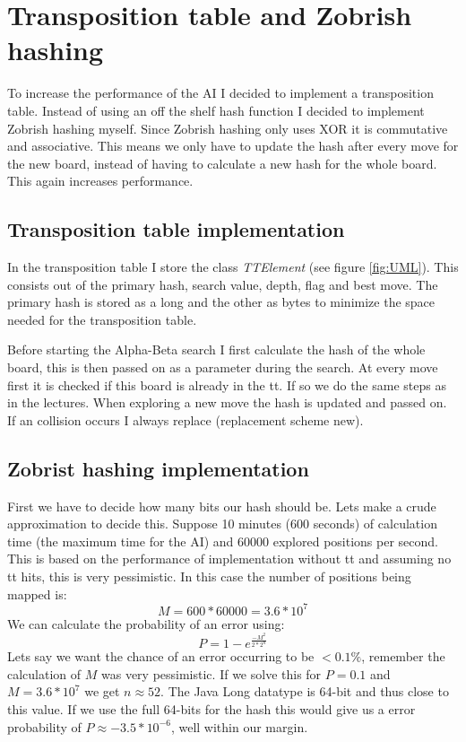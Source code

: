 \documentclass{article}
\begin{document}
\section{Transposition table and Zobrish hashing}
To increase the performance of the AI I decided to implement a transposition table. Instead of using an off the shelf hash function I decided to implement Zobrish hashing myself. Since Zobrish hashing only uses XOR it is commutative and associative. This means we only have to update the hash after every move for the new board, instead of having to calculate a new hash for the whole board. This again increases performance.

\subsection{Transposition table implementation}
In the transposition table I store the class \textit{TTElement} (see figure \ref{fig:UML}). This consists out of the primary hash, search value, depth, flag and best move. The primary hash is stored as a long and the other as bytes to minimize the space needed for the transposition table. 

Before starting the Alpha-Beta search I first calculate the hash of the whole board, this is then passed on as a parameter during the search. At every move first it is checked if this board is already in the tt. If so we do the same steps as in the lectures. When exploring a new move the hash is updated and passed on.
If an collision occurs I always replace (replacement scheme new).

\subsection{Zobrist hashing implementation}
First we have to decide how many bits our hash should be. Lets make a crude approximation to decide this. Suppose 10 minutes (600 seconds) of calculation time (the maximum time for the AI) and 60000 explored positions per second. This is based on the performance of implementation without tt and assuming no tt hits, this is very pessimistic. In this case the number of positions being mapped is: 
\begin{equation*}
    M = 600*60000 = 3.6*10^{7}
\end{equation*}
We can calculate the probability of an error using:
\begin{equation*}
    P = 1 - e^{\frac{-M^2}{2*2^n}}
\end{equation*}
Lets say we want the chance of an error occurring to be $< 0.1\%$, remember the calculation of $M$ was very pessimistic. If we solve this for $P = 0.1$ and $M = 3.6*10^{7}$ we get $n \approx 52$. The Java Long datatype is 64-bit and thus close to this value. If we use the full 64-bits for the hash this would give us a error probability of $P \approx -3.5*10^{-6}$, well within our margin.
\end{document}
